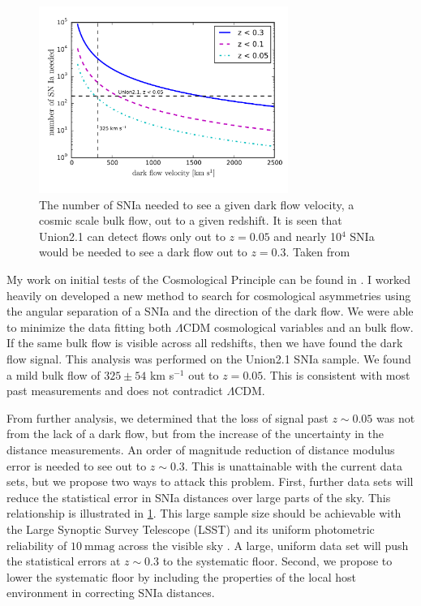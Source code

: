 \documentclass[apj, iop]{emulateapj}
\newcommand{\sn}{SNIa}
\newcommand{\lcdm}{$\Lambda$CDM}     %
\begin{document}
\begin{figure}
	\includegraphics[width=3.2in]{what_dataset_size_v_velocity.pdf} 
    \caption{The number of \sn{} needed to see a given dark flow velocity, a
	cosmic scale bulk flow, out to a given redshift. It is seen that Union2.1 
	can detect flows only out to $z=0.05$ and nearly 10$^4$ \sn{} would be 
	needed to see a dark flow out to $z=0.3$. Taken from \cite{Mathews16}}
	\label{f:sn-needed} 
\end{figure}

My work on initial tests of the Cosmological Principle can be found in
\cite{Mathews16}. I worked heavily on developed a new method to search for
cosmological asymmetries using the angular separation of a \sn{} and the
direction of the dark flow. We were able to minimize the data fitting both
\lcdm{} cosmological variables and  an bulk flow. If the same bulk flow is
visible across all redshifts, then we have found the dark flow signal. This
analysis was performed on the Union2.1 \citep{Suzuki12} \sn{} sample. We found a
mild bulk flow of $325 \pm 54$ km s$^{-1}$ out to $z = 0.05$. This is consistent
with most past measurements and does not contradict \lcdm{}.

From further analysis, we determined that the loss of signal past $z \sim 0.05$
was not from the lack of a dark flow, but from the increase of the uncertainty
in the distance measurements. An order of magnitude reduction of distance
modulus error is needed to see out to $z \sim 0.3$. This is unattainable with
the current data sets, but we propose two ways to attack this problem. First,
further data sets will reduce the statistical error in \sn{} distances over
large parts of the sky. This relationship is illustrated in \cref{f:sn-needed}.
This large sample size should be achievable with the Large Synoptic Survey
Telescope (LSST) and its uniform photometric reliability of $10 ~\text{mmag}$
across the visible sky \citep{Ivezic08}. A large, uniform data set will push the
statistical errors at $z\sim 0.3$ to the systematic floor. Second, we propose to
lower the systematic floor by including the properties of the local host
environment in correcting \sn{} distances.
\end{document}

